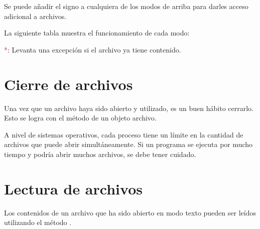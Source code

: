 Se puede añadir el signo \ttt{\qq + \qq} a cualquiera de los modos de arriba para darles acceso adicional a archivos.

La siguiente tabla muestra el funcionamiento de cada modo:
\medskip\medskip


\medskip\medskip

\textcolor{Crimson}{*}: Levanta una excepción  si el archivo ya tiene contenido.

\section{Cierre de archivos}

Una vez que un archivo haya sido abierto y utilizado, es un buen hábito cerrarlo.
Esto se logra con el método  de un objeto archivo.


A nivel de sistemas operativos, cada proceso tiene un límite en la cantidad de archivos que puede abrir simultáneamente.
Si un programa se ejecuta por mucho tiempo y podría abrir muchos archivos, se debe tener cuidado.

\section{Lectura de archivos}

Los contenidos de un archivo que ha sido abierto en modo texto pueden ser leídos utilizando el método .

